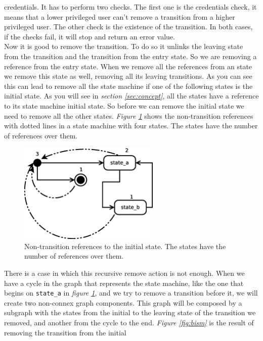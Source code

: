 credentials. It has to perform two checks. The first one is the credentials check, it means that a lower privileged user can't remove a 
transition from a higher privileged user. The other check is the existence of the transition. In both cases, if the checks fail, it will
stop and return an error value.\\
Now it is good to remove the transition. To do so it unlinks the leaving state from the transition and the transition from the entry state.
So we are removing a reference from the entry state. When we remove all the references from an state we remove this state as well, removing
all its leaving transitions. As you can see this can lead to remove all the state machine if one of the following states is the initial 
state.
As you will see in \emph{section \ref{sec:concept}}, all the states have a reference to its state machine initial state. So before we can
remove the initial state we need to remove all the other states. \emph{Figure \ref{fig:smrefs}} shows the non-transition references with
dotted lines in a state machine with four states. The states have the number of references over them.\\
\begin{figure}[h]
  \centering
  \includegraphics[width=0.6\textwidth,keepaspectratio]{img/smrefs}
  \caption{Non-transition references to the initial state. The states have the number of references over them.}
  \label{fig:smrefs}
\end{figure}
There is a case in which this recursive remove action is not enough. When we have a cycle in the graph that represents the state machine,
like the one that begins on \texttt{state\_a} in \emph{figure \ref{fig:smrefs}}, and we try to remove a transition before it, we will 
create
two non-connex graph components. This graph will be composed by a subgraph with the states from the initial to the leaving state of the 
transition we 
removed, and another from the cycle to the end. \emph{Figure \ref{fig:bism}} is the result of removing the transition from the initial
